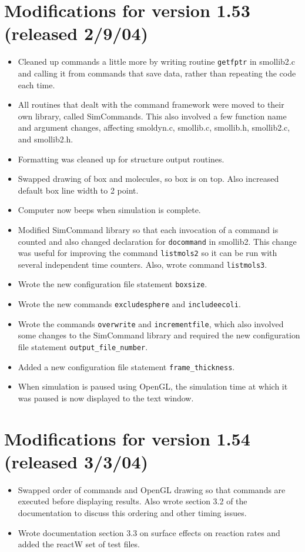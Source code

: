 \documentclass {scrbook}
\newcommand {\ttt} {\texttt}
\begin{document}
\section{Modifications for version 1.53 (released 2/9/04)}
\begin{itemize}
\item Cleaned up commands a little more by writing routine \ttt{getfptr} in smollib2.c and calling it from commands that save data, rather than repeating the code each time.
\item All routines that dealt with the command framework were moved to their own library, called SimCommands. This also involved a few function name and argument changes, affecting smoldyn.c, smollib.c, smollib.h, smollib2.c, and smollib2.h.
\item Formatting was cleaned up for structure output routines.
\item Swapped drawing of box and molecules, so box is on top. Also increased default box line width to 2 point.
\item Computer now beeps when simulation is complete.
\item Modified SimCommand library so that each invocation of a command is counted and also changed declaration for \ttt{docommand} in smollib2. This change was useful for improving the command \ttt{listmols2} so it can be run with several independent time counters. Also, wrote command \ttt{listmols3}.
\item Wrote the new configuration file statement \ttt{boxsize}.
\item Wrote the new commands \ttt{excludesphere} and \ttt{includeecoli}.
\item Wrote the commands \ttt{overwrite} and \ttt{incrementfile}, which also involved some changes to the SimCommand library and required the new configuration file statement \ttt{output\_file\_number}.
\item Added a new configuration file statement \ttt{frame\_thickness}.
\item When simulation is paused using OpenGL, the simulation time at which it was paused is now displayed to the text window.
\end{itemize}

\section{Modifications for version 1.54 (released 3/3/04)}
\begin{itemize}
\item Swapped order of commands and OpenGL drawing so that commands are executed before displaying results. Also wrote section 3.2 of the documentation to discuss this ordering and other timing issues.
\item Wrote documentation section 3.3 on surface effects on reaction rates and added the reactW set of test files.
\end{itemize}
\end{document}
